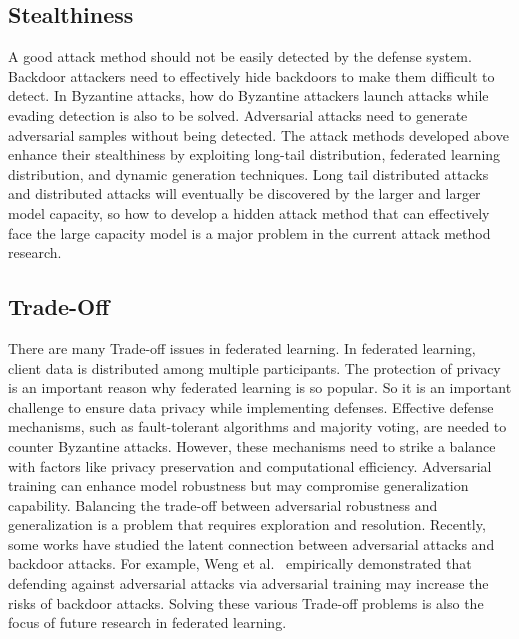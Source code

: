 \documentclass[a4paper,fleqn]{cas-dc}
\begin{document}
    \subsection{Stealthiness}
    
    A good attack method should not be easily detected by
    the defense system. Backdoor attackers need to effectively
    hide backdoors to make them diﬀicult to detect. In
    Byzantine attacks, how do Byzantine attackers launch
    attacks while evading detection is also to be solved.
    Adversarial attacks need to generate adversarial samples
    without being detected. The attack methods developed
    above enhance their stealthiness by exploiting long-tail
    distribution, federated learning distribution, and dynamic
    generation techniques. Long tail distributed attacks and
    distributed attacks will eventually be discovered by the
    larger and larger model capacity, so how to develop a
    hidden attack method that can effectively face the large
    capacity model is a major problem in the current attack
    method research.   
    
    \subsection{Trade-Off}
    There are many Trade-off issues in federated learning.
    In federated learning, client data is distributed among
    multiple participants. The protection of privacy is an
    important reason why federated learning is so popular.
    So it is an important challenge to ensure data privacy
    while implementing defenses. Effective defense
    mechanisms, such as fault-tolerant algorithms and majority
    voting, are needed to counter Byzantine attacks. However,
    these mechanisms need to strike a balance with factors
    like privacy preservation and computational eﬀiciency.
    Adversarial training can enhance model robustness but
    may compromise generalization capability. Balancing the
    trade-off between adversarial robustness and
    generalization is a problem that requires exploration and resolution.
    Recently, some works have studied the latent connection
    between adversarial attacks and backdoor attacks. For
    example, Weng et al.~\cite{weng2020trade} empirically demonstrated that
    defending against adversarial attacks via adversarial
    training may increase the risks of backdoor attacks. Solving
    these various Trade-off problems is also the focus of future
    research in federated learning.
    
\end{document}
